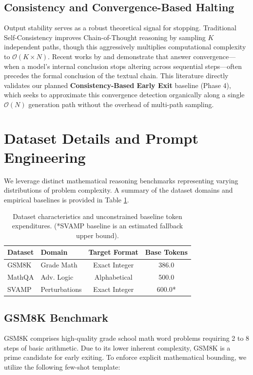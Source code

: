 \documentclass[11pt]{article}
\begin{document}
\subsection{Consistency and Convergence-Based Halting}
Output stability serves as a robust theoretical signal for stopping. Traditional Self-Consistency \cite{wang2022selfconsistency} improves Chain-of-Thought reasoning by sampling $K$ independent paths, though this aggressively multiplies computational complexity to $\mathcal{O}(K \times N)$. Recent works by \citet{chen2025answer} and \citet{liu2025early} demonstrate that answer convergence—when a model's internal conclusion stops altering across sequential steps—often precedes the formal conclusion of the textual chain. This literature directly validates our planned \textbf{Consistency-Based Early Exit} baseline (Phase 4), which seeks to approximate this convergence detection organically along a single $\mathcal{O}(N)$ generation path without the overhead of multi-path sampling.

\section{Dataset Details and Prompt Engineering}
We leverage distinct mathematical reasoning benchmarks representing varying distributions of problem complexity. A summary of the dataset domains and empirical baselines is provided in Table \ref{tab:dataset_stats}.

\begin{table}[h]
\centering
\small
\begin{tabular}{@{}llcc@{}}
\toprule
\textbf{Dataset} & \textbf{Domain} & \textbf{Target Format} & \textbf{Base Tokens} \\ \midrule
GSM8K & Grade Math & Exact Integer & 386.0 \\
MathQA & Adv. Logic & Alphabetical & 500.0 \\
SVAMP & Perturbations & Exact Integer & 600.0* \\ \bottomrule
\end{tabular}
\caption{Dataset characteristics and unconstrained baseline token expenditures. (*SVAMP baseline is an estimated fallback upper bound).}
\label{tab:dataset_stats}
\end{table}

\subsection{GSM8K Benchmark}
GSM8K comprises high-quality grade school math word problems requiring 2 to 8 steps of basic arithmetic. Due to its lower inherent complexity, GSM8K is a prime candidate for early exiting. To enforce explicit mathematical bounding, we utilize the following few-shot template:
\end{document}
